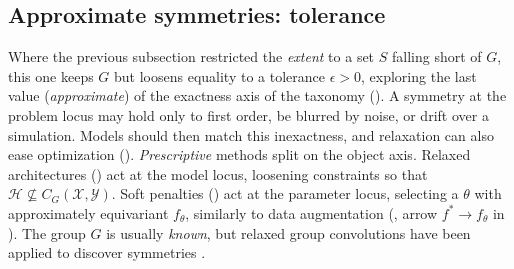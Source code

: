 \documentclass[mathematics,review,submit,moreauthors]{Definitions/mdpi}
\begin{document}
\subsection{Approximate symmetries: tolerance}\label{sec:soft-equivariance}
Where the previous subsection restricted the \emph{extent} to a set $S$ falling short of $G$, this one keeps $G$ but loosens equality to a tolerance $\epsilon>0$, exploring the last value (\emph{approximate}) of the exactness axis of the taxonomy ().
A symmetry at the problem locus may hold only to first order, be blurred by noise, or drift over a simulation.
Models should then match this inexactness, and relaxation can also ease optimization ().
\emph{Prescriptive} methods split on the object axis.
Relaxed architectures () act at the model locus, loosening constraints so that $\mathcal{H}\not\subseteq C_G(\mathcal{X},\mathcal{Y})$.
Soft penalties () act at the parameter locus, selecting a $\theta$ with approximately equivariant $f_\theta$, similarly to data augmentation (, arrow $f^*\to f_\theta$ in ).
The group $G$ is usually \emph{known}, but relaxed group convolutions have been applied to discover symmetries \citep{wang2024p4icml}.
\end{document}
